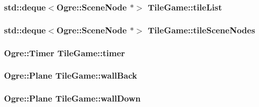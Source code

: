 \hypertarget{classTileGame_ad9bec31020eaa7dc719d8e9b8af20ee2}{
\subsubsection[{tile\-List}]{\setlength{\rightskip}{0pt plus 5cm}std\-::deque$<$Ogre\-::\-Scene\-Node $\ast$$>$ Tile\-Game\-::tile\-List\hspace{0.3cm}{\ttfamily [protected]}}}\label{classTileGame_ad9bec31020eaa7dc719d8e9b8af20ee2}
\hypertarget{classTileGame_ac8b228c7849cb924a099f94de266c42d}{
\subsubsection[{tile\-Scene\-Nodes}]{\setlength{\rightskip}{0pt plus 5cm}std\-::deque$<$Ogre\-::\-Scene\-Node $\ast$$>$ Tile\-Game\-::tile\-Scene\-Nodes\hspace{0.3cm}{\ttfamily [protected]}}}\label{classTileGame_ac8b228c7849cb924a099f94de266c42d}
\hypertarget{classTileGame_adbfc142c4bd14007f4aec65b164bbea7}{
\subsubsection[{timer}]{\setlength{\rightskip}{0pt plus 5cm}Ogre\-::\-Timer Tile\-Game\-::timer\hspace{0.3cm}{\ttfamily [protected]}}}\label{classTileGame_adbfc142c4bd14007f4aec65b164bbea7}
\hypertarget{classTileGame_a3c37c43bfc4c0387a3f29f783e4f436a}{
\subsubsection[{wall\-Back}]{\setlength{\rightskip}{0pt plus 5cm}Ogre\-::\-Plane Tile\-Game\-::wall\-Back\hspace{0.3cm}{\ttfamily [protected]}}}\label{classTileGame_a3c37c43bfc4c0387a3f29f783e4f436a}
\hypertarget{classTileGame_af1834b17a2460b1613d93be25492113c}{
\subsubsection[{wall\-Down}]{\setlength{\rightskip}{0pt plus 5cm}Ogre\-::\-Plane Tile\-Game\-::wall\-Down\hspace{0.3cm}{\ttfamily [protected]}}}\label{classTileGame_af1834b17a2460b1613d93be25492113c}
